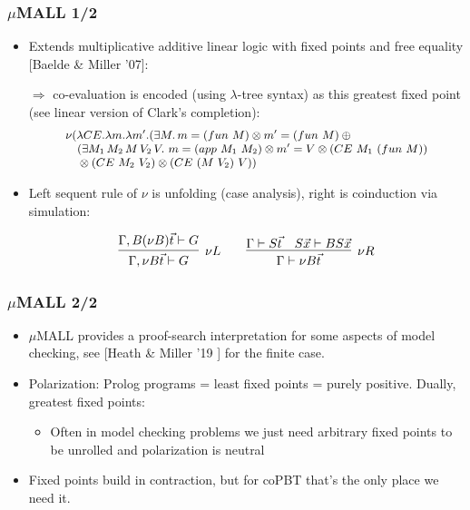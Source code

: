 \documentclass{beamer}
\begin{document}
\begin{frame}
  \frametitle{$\mu$MALL 1/2}

  \begin{itemize}
  \item Extends multiplicative additive linear logic with fixed points and free equality [Baelde \& Miller '07]:

    $\Rightarrow$ co-evaluation is encoded (using $\lambda$-tree syntax) as this greatest fixed point 
    (see linear version of Clark's completion):
    $$
\begin{small}
\begin{array}{l}
    \nu (\lambda {CE}.\lambda m.\lambda m'. (\exists M.\, m = (fun\  M) \otimes  m' = (fun\  M)  \oplus\mbox{}\\
  \quad(\exists M_1\, M_2\, M\,  V_2\, V.\ m = (app\ M_1\ M_2)  \otimes m' =  V \otimes
     ({CE} \ M_1 \ (fun\  M)) \\
  \quad \mbox{} \otimes ({CE\ } M_2\ V_2)   \otimes ({CE} \ (M \ V_2) \ V))
 \end{array}
\end{small}
 $$
\item Left sequent rule of $\nu$ is unfolding (case analysis), right is coinduction via simulation:
  \begin{small}
    \[
      \begin{array}{l}
        \infer[\nu L]{\Gamma, \nu B\vec t\vdash G}{\Gamma, B(\nu B)\vec t\vdash G}\qquad
        \infer[\nu R]{\Gamma\vdash \nu B\vec t}{\Gamma\vdash S\vec t\quad S\vec x\vdash B S\vec x}
      \end{array}
      \]
  \end{small}
  \end{itemize}
\end{frame}
\begin{frame}
  \frametitle{$\mu$MALL 2/2}
  \begin{itemize}
  \item $\mu$MALL provides a proof-search interpretation for some aspects of model checking, see [Heath \& Miller '19 ] for the finite case.
  \item Polarization: Prolog programs = least fixed points = purely positive. Dually, greatest fixed points:
    \begin{itemize}
    \item Often in model checking problems we just need arbitrary fixed points to be unrolled and polarization is neutral
    \end{itemize}
  \item Fixed points build in contraction, but for coPBT that's the only place we need it.
  \end{itemize}
\end{frame}
\end{document}
